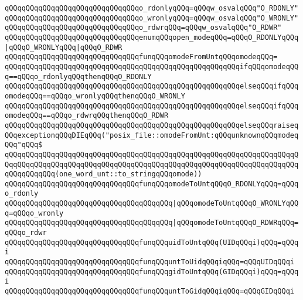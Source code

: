 \newline
\verb|qQQqqQQqqQQqqQQqqQQqqQQqqQQqqQQqo_rdonlyqQQq=qQQqw_osvalqQQq"O_RDONLY"|\newline
\verb|qQQqqQQqqQQqqQQqqQQqqQQqqQQqqQQqo_wronlyqQQq=qQQqw_osvalqQQq"O_WRONLY"|\newline
\verb|qQQqqQQqqQQqqQQqqQQqqQQqqQQqqQQqo_rdwrqQQq=qQQqw_osvalqQQq"O_RDWR"|\newline
\newline
\verb|qQQqqQQqqQQqqQQqqQQqqQQqqQQqqQQqenumqQQqopen_modeqQQq=qQQqO_RDONLYqQQq|\verb#|qQQqO_WRONLYqQQq|qQQqO_RDWR#\newline
\verb|qQQqqQQqqQQqqQQqqQQqqQQqqQQqqQQqfunqQQqomodeFromUntqQQqomodeqQQq=|\newline
\verb|qQQqqQQqqQQqqQQqqQQqqQQqqQQqqQQqqQQqqQQqqQQqqQQqqQQqqQQqifqQQqomodeqQQq==qQQqo_rdonlyqQQqthenqQQqO_RDONLY|\newline
\verb|qQQqqQQqqQQqqQQqqQQqqQQqqQQqqQQqqQQqqQQqqQQqqQQqqQQqqQQqelseqQQqifqQQqomodeqQQq==qQQqo_wronlyqQQqthenqQQqO_WRONLY|\newline
\verb|qQQqqQQqqQQqqQQqqQQqqQQqqQQqqQQqqQQqqQQqqQQqqQQqqQQqqQQqelseqQQqifqQQqomodeqQQq==qQQqo_rdwrqQQqthenqQQqO_RDWR|\newline
\verb|qQQqqQQqqQQqqQQqqQQqqQQqqQQqqQQqqQQqqQQqqQQqqQQqqQQqqQQqelseqQQqraiseqQQqexceptionqQQqDIEqQQq("posix_file::omodeFromUnt:qQQqunknownqQQqmodeqQQq"qQQq$|\newline
\verb|qQQqqQQqqQQqqQQqqQQqqQQqqQQqqQQqqQQqqQQqqQQqqQQqqQQqqQQqqQQqqQQqqQQqqQQqqQQqqQQqqQQqqQQqqQQqqQQqqQQqqQQqqQQqqQQqqQQqqQQqqQQqqQQqqQQqqQQqqQQqqQQqqQQqqQQq(one_word_unt::to_stringqQQqomode))|\newline
\newline
\verb|qQQqqQQqqQQqqQQqqQQqqQQqqQQqqQQqfunqQQqomodeToUntqQQqO_RDONLYqQQq=qQQqo_rdonly|\newline
\verb|qQQqqQQqqQQqqQQqqQQqqQQqqQQqqQQqqQQqqQQq|\verb#|qQQqomodeToUntqQQqO_WRONLYqQQq=qQQqo_wronly#\newline
\verb|qQQqqQQqqQQqqQQqqQQqqQQqqQQqqQQqqQQqqQQq|\verb#|qQQqomodeToUntqQQqO_RDWRqQQq=qQQqo_rdwr#\newline
\newline
\verb|qQQqqQQqqQQqqQQqqQQqqQQqqQQqqQQqfunqQQquidToUntqQQq(UIDqQQqi)qQQq=qQQqi|\newline
\verb|qQQqqQQqqQQqqQQqqQQqqQQqqQQqqQQqfunqQQquntToUidqQQqiqQQq=qQQqUIDqQQqi|\newline
\verb|qQQqqQQqqQQqqQQqqQQqqQQqqQQqqQQqfunqQQqgidToUntqQQq(GIDqQQqi)qQQq=qQQqi|\newline
\verb|qQQqqQQqqQQqqQQqqQQqqQQqqQQqqQQqfunqQQquntToGidqQQqiqQQq=qQQqGIDqQQqi|\newline
